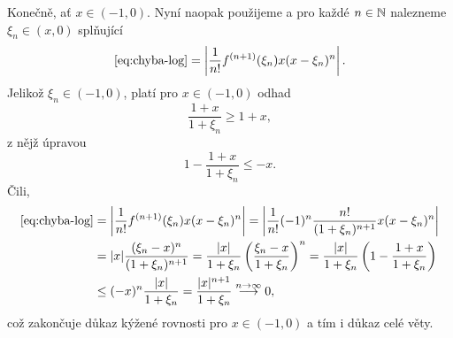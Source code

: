 \begin{thmproof}
 Konečně, ať $x \in (-1,0)$. Nyní naopak použijeme
  a pro každé $n \in \mathbb{N}$ nalezneme
 $\xi_n \in (x,0)$ splňující
 \[
  \eqref{eq:chyba-log} = \left| \frac{1}{n!}f^{(n+1)}(\xi_n)x(x-\xi_n)^{n}
  \right|.
 \]
 Jelikož $\xi_n \in (-1,0)$, platí pro $x \in (-1,0)$ odhad
 \[
  \frac{1+x}{1+\xi_n} \geq 1 + x,
 \]
 z nějž úpravou
 \[
  1 - \frac{1+x}{1 + \xi_n} \leq -x.
 \]
 Čili,
 \begin{align*}
  \eqref{eq:chyba-log} &= \left| \frac{1}{n!}f^{(n+1)}(\xi_n)x(x-\xi_n)^{n}
  \right| = \left| \frac{1}{n!}(-1)^{n}\frac{n!}{(1+\xi_n)^{n+1}}x(x-\xi_n)^{n}
  \right| \\
  &= |x|\frac{(\xi_n - x)^n}{(1 + \xi_n)^{n+1}} = \frac{|x|}{1 + \xi_n} \left(
  \frac{\xi_n - x}{1 + \xi_n} \right)^{n} = \frac{|x|}{1 + \xi_n} \left( 1 -
 \frac{1 + x}{1 + \xi_n} \right)\\
  & \leq (-x)^{n}\frac{|x|}{1 + \xi_n} = \frac{|x|^{n+1}}{1 + \xi_n}
  \overset{n \to \infty}{\longrightarrow} 0,
 \end{align*}
 což zakončuje důkaz kýžené rovnosti pro $x \in (-1,0)$ a tím i důkaz celé věty.
\end{thmproof}
